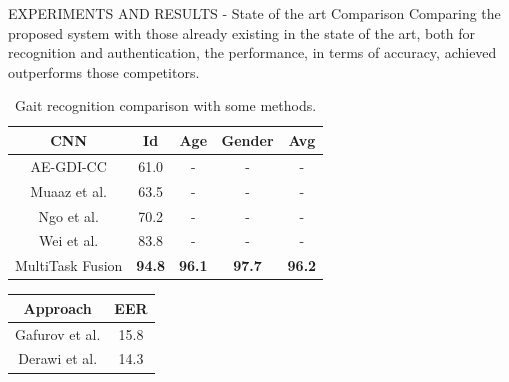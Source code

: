 \documentclass[10pt]{beamer}
\begin{document}
\begin{frame}{EXPERIMENTS AND RESULTS - State of the art Comparison}
    Comparing the proposed system with those already existing in the state 
    of the art, both for recognition and authentication, the performance, in 
    terms of accuracy, achieved outperforms those competitors.
        \begin{minipage}{\linewidth}
        \centering
        \begin{minipage}{0.45\linewidth}
            \begin{table}[h!]
                \centering
                \begin{adjustbox}{max width=\textwidth}
                \begin{tabular}{|c|ccc|c|}
                    \hline
                    CNN & Id & Age & Gender & Avg\\
                    \hline
                    AE-GDI-CC & 61.0 & - & - & -\\
                    Muaaz et al. & 63.5 & - & - & -\\
                    Ngo et al. & 70.2 & - & - & -\\
                    Wei et al. & 83.8 & - & - & - \\
                    \hline
                    MultiTask Fusion & \bfseries{94.8} & \bfseries{96.1} & \bfseries{97.7} & \bfseries{96.2}\\
                    \hline
                \end{tabular}
                \end{adjustbox}
                \caption{Gait recognition comparison with some methods.}
                \label{Gait comparison}
            \end{table}
        \end{minipage}
        \hspace{0.05\linewidth}
        \begin{minipage}{0.45\linewidth}
            \begin{table}[h!]
                \centering
                \begin{adjustbox}{max width=\textwidth}
                \begin{tabular}{|c|c|}
                    \hline
                    Approach & EER\\
                    \hline
                    Gafurov et al. & 15.8 \\
                    Derawi et al. & 14.3 \\

\end{tabular}
\end{adjustbox}
\end{table}
\end{minipage}
\end{minipage}
\end{frame}
\end{document}
